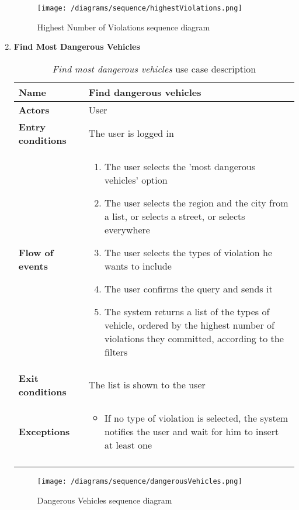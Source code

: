 \begin{enumerate}
				\begin{figure}[h]
					\centering
					\texttt{[image: /diagrams/sequence/highestViolations.png]}
					\caption{Highest Number of Violations sequence diagram}
				\end{figure}
			
				\FloatBarrier
			\item \textbf{Find Most Dangerous Vehicles}
				\begin{longtable}{p{0.25\linewidth}p{0.75\linewidth}}
					\toprule
					\textbf{Name} & \textbf{Find dangerous vehicles} \\
					\midrule
					\textbf{Actors} & User \\
					\midrule
					\textbf{Entry conditions} & The user is logged in \\
					\midrule
					\textbf{Flow of events} & 
					\begin{enumerate}
						\item The user selects the 'most dangerous vehicles' option
						\item The user selects the region and the city from a list, or selects a street, or selects everywhere
						\item The user selects the types of violation he wants to include
						\item The user confirms the query and sends it
						\item The system returns a list of the types of vehicle, ordered by the highest number of violations they committed, according to the filters
					\end{enumerate} \\
					\midrule
					\textbf{Exit conditions} & The list is shown to the user\\
					\midrule
					\textbf{Exceptions} & 
					\begin{itemize}
						\item 	If no type of violation is selected, the system notifies the user and wait for him to insert at least one	
					\end{itemize} \\
					\bottomrule
					\caption{\emph{Find most dangerous vehicles} use case description}
				\end{longtable}
			
				\begin{figure}[h]
					\centering
					\texttt{[image: /diagrams/sequence/dangerousVehicles.png]}
					\caption{Dangerous Vehicles sequence diagram}
				\end{figure}
			

\end{enumerate}

